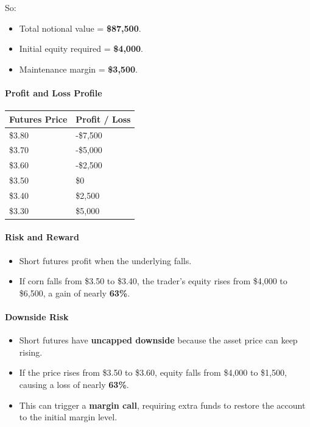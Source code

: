 \documentclass[12pt,openany]{book}
\begin{document}
So:

\begin{itemize}[leftmargin=*]
    \item Total notional value = \textbf{\$87,500}.
    \item Initial equity required = \textbf{\$4,000}.
    \item Maintenance margin = \textbf{\$3,500}.
\end{itemize}

\paragraph{Profit and Loss Profile}

\begin{center}
\small
\begin{tabular}{|L{0.28\textwidth}|L{0.28\textwidth}|}
\hline
\textbf{Futures Price} & \textbf{Profit / Loss} \\ \hline
\$3.80 & -\$7,500 \\ \hline
\$3.70 & -\$5,000 \\ \hline
\$3.60 & -\$2,500 \\ \hline
\$3.50 & \$0 \\ \hline
\$3.40 & \$2,500 \\ \hline
\$3.30 & \$5,000 \\ \hline
\end{tabular}
\end{center}

\paragraph{Risk and Reward}

\begin{itemize}[leftmargin=*]
    \item Short futures profit when the underlying falls.
    \item If corn falls from \$3.50 to \$3.40, the trader's equity rises from \$4,000 to \$6,500, a gain of nearly \textbf{63\%}.
\end{itemize}

\paragraph{Downside Risk}

\begin{itemize}[leftmargin=*]
    \item Short futures have \textbf{uncapped downside} because the asset price can keep rising.
    \item If the price rises from \$3.50 to \$3.60, equity falls from \$4,000 to \$1,500, causing a loss of nearly \textbf{63\%}.
    \item This can trigger a \textbf{margin call}, requiring extra funds to restore the account to the initial margin level.
\end{itemize}
\end{document}
